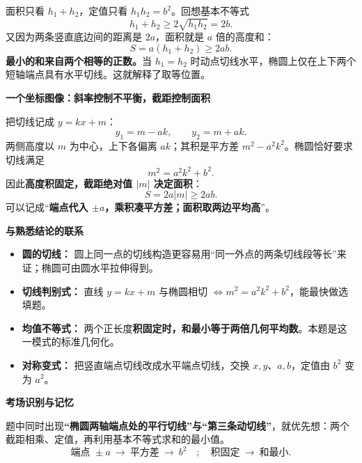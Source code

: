 \begin{explanationbox}
面积只看 $h_1+h_2$，定值只看 $h_1h_2=b^2$。回想基本不等式
\[
h_1+h_2\ge2\sqrt{h_1h_2}=2b.
\]
又因为两条竖直底边间的距离是 $2a$，面积就是 $a$ 倍的高度和：
\[
S=a(h_1+h_2)\ge2ab.
\]
\textbf{最小的和来自两个相等的正数。}当 $h_1=h_2$ 时动点切线水平，椭圆上仅在上下两个短轴端点具有水平切线。这就解释了取等位置。

\medskip
\textbf{\textcolor{CExplanation}{一个坐标图像：斜率控制不平衡，截距控制面积}}

把切线记成 $y=kx+m$：
\[
y_1=m-ak,\qquad y_2=m+ak.
\]
两侧高度以 $m$ 为中心，上下各偏离 $ak$；其积是平方差 $m^2-a^2k^2$。椭圆恰好要求切线满足
\[
m^2=a^2k^2+b^2.
\]
因此\textbf{高度积固定，截距绝对值 $|m|$ 决定面积}：
\[
S=2a|m|\ge2ab.
\]
可以记成“\textbf{端点代入 $\pm a$，乘积凑平方差；面积取两边平均高}”。

\medskip
\textbf{\textcolor{CExplanation}{与熟悉结论的联系}}
\begin{itemize}[leftmargin=*,itemsep=0.4em,topsep=0.3em]
\item \textbf{圆的切线：} 圆上同一点的切线构造更容易用“同一外点的两条切线段等长”来证；椭圆可由圆水平拉伸得到。
\item \textbf{切线判别式：} 直线 $y=kx+m$ 与椭圆相切 $\Longleftrightarrow m^2=a^2k^2+b^2$，能最快做选填题。
\item \textbf{均值不等式：} 两个正长度\textbf{积固定时，和最小等于两倍几何平均数}。本题是这一模式的标准几何化。
\item \textbf{对称变式：} 把竖直端点切线改成水平端点切线，交换 $x,y$、$a,b$，定值由 $b^2$ 变为 $a^2$。
\end{itemize}

\medskip
\textbf{\textcolor{CExplanation}{考场识别与记忆}}

题中同时出现\textbf{“椭圆两轴端点处的平行切线”与“第三条动切线”}，就优先想：两个截距相乘、定值，再利用基本不等式求和的最小值。
\[
\boxed{\text{端点 }\pm a\ \to\ \text{平方差}\ \to\ b^2
\quad;\quad \text{积固定}\ \to\ \text{和最小}.}
\]
\end{explanationbox}
